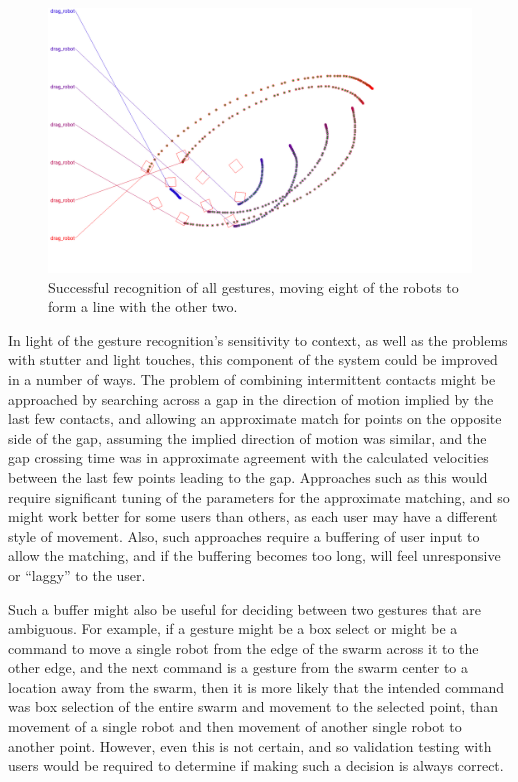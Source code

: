 \begin{figure}
 	\centering
 	\includegraphics[width=\textwidth]{../../software/tool/test_pipeline/good_run/u8_c10_t10/u8_c10_t10_gestures.png}
 	\caption{Successful recognition of all gestures, moving eight of the robots to form a line with the other two. }
 	\label{recognizer_win}
 \end{figure}
 
In light of the gesture recognition's sensitivity to context, as well as the problems with stutter and light touches, this component of the system could be improved in a number of ways. 
The problem of combining intermittent contacts might be approached by searching across a gap in the direction of motion implied by the last few contacts, and allowing an approximate match for points on the opposite side of the gap, assuming the implied direction of motion was similar, and the gap crossing time was in approximate agreement with the calculated velocities between the last few points leading to the gap. 
Approaches such as this would require significant tuning of the parameters for the approximate matching, and so might work better for some users than others, as each user may have a different style of movement. 
Also, such approaches require a buffering of user input to allow the matching, and if the buffering becomes too long, will feel unresponsive or ``laggy'' to the user. 

Such a buffer might also be useful for deciding between two gestures that are ambiguous. 
For example, if a gesture might be a box select or might be a command to move a single robot from the edge of the swarm across it to the other edge, and the next command is a gesture from the swarm center to a location away from the swarm, then it is more likely that the intended command was box selection of the entire swarm and movement to the selected point, than movement of a single robot and then movement of another single robot to another point. 
However, even this is not certain, and so validation testing with users would be required to determine if making such a decision is always correct. 

